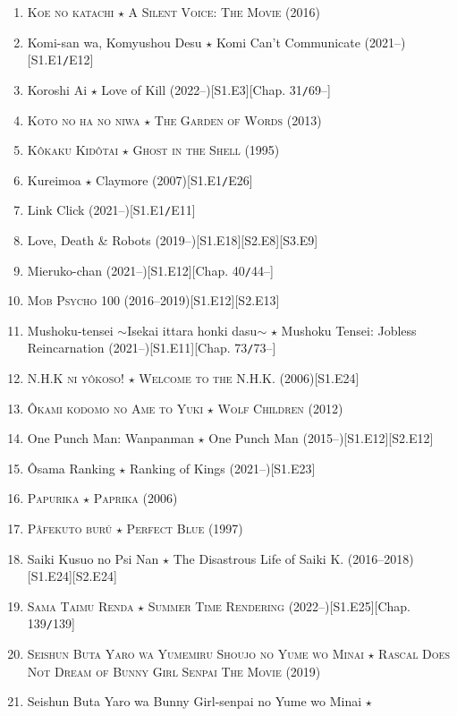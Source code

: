 \documentclass{article}
\numberwithin{equation}{section}
\begin{document}
\begin{enumerate}
    \item \textsc{Koe no katachi $\star$ A Silent Voice: The Movie} (2016)
    \item Komi-san wa, Komyushou Desu $\star$ Komi Can't Communicate (2021--)\hfill[S1.E1\texttt{/}E12]
    \item Koroshi Ai $\star$ Love of Kill (2022--)\hfill[S1.E3][Chap. 31\texttt{/}69--]
    \item \textsc{Koto no ha no niwa $\star$ The Garden of Words} (2013)
    \item \textsc{K\^okaku Kid\^otai $\star$ Ghost in the Shell} (1995)
    \item Kureimoa $\star$ Claymore (2007)\hfill[S1.E1\texttt{/}E26]
    \item Link Click (2021--)\hfill[S1.E1\texttt{/}E11]
    \item Love, Death \& Robots (2019--)\hfill[S1.E18][S2.E8][S3.E9]
    \item Mieruko-chan (2021--)\hfill[S1.E12][Chap. 40\texttt{/}44--]
    \item \textsc{Mob Psycho 100} (2016--2019)\hfill[S1.E12][S2.E13]
    \item Mushoku-tensei $\sim$Isekai ittara honki dasu$\sim$ $\star$ Mushoku Tensei: Jobless Reincarnation (2021--)\hfill[S1.E11][Chap. 73\texttt{/}73--]
    \item \textsc{N.H.K ni yôkoso! $\star$ Welcome to the N.H.K.} (2006)\hfill[S1.E24]
    \item \textsc{\^Okami kodomo no Ame to Yuki $\star$ Wolf Children} (2012)
    \item One Punch Man: Wanpanman $\star$ One Punch Man (2015--)\hfill[S1.E12][S2.E12]
    \item \^Osama Ranking $\star$ Ranking of Kings (2021--)\hfill[S1.E23]
    \item \textsc{Papurika $\star$ Paprika} (2006)
    \item \textsc{Pâfekuto burû $\star$ Perfect Blue} (1997)
    \item Saiki Kusuo no Psi Nan $\star$ The Disastrous Life of Saiki K. (2016--2018)\hfill[S1.E24][S2.E24]
    \item \textsc{Sama Taimu Renda $\star$ Summer Time Rendering} (2022--)\hfill[S1.E25][Chap. 139\texttt{/}139]
    \item \textsc{Seishun Buta Yaro wa Yumemiru Shoujo no Yume wo Minai $\star$ Rascal Does Not Dream of Bunny Girl Senpai The Movie} (2019)
    \item Seishun Buta Yaro wa Bunny Girl-senpai no Yume wo Minai $\star$
    

\end{enumerate}
\end{document}
